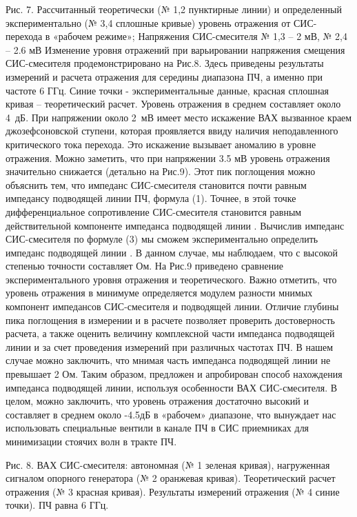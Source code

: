 \documentclass[a4paper]{article}
\begin{document}
Рис. 7. Рассчитанный теоретически (№ 1,2 пунктирные линии) и определенный экспериментально (№ 3,4 сплошные кривые) уровень отражения от СИС-перехода в «рабочем режиме»; Напряжения СИС-смесителя № 1,3 –  2 мВ, № 2,4 – 2.6 мВ
Изменение уровня отражений при варьировании напряжения смещения СИС-смесителя продемонстрировано на Рис.8. Здесь приведены результаты измерений и расчета отражения для середины диапазона ПЧ, а именно при частоте 6 ГГц. Синие точки - экспериментальные данные, красная сплошная кривая – теоретический расчет. Уровень отражения в среднем составляет около 4 дБ. При напряжении около 2 мВ имеет место искажение ВАХ вызванное краем джозефсоновской ступени, которая проявляется ввиду наличия неподавленного критического тока перехода. Это искажение вызывает аномалию в уровне отражения.  Можно заметить, что при напряжении 3.5 мВ уровень отражения значительно снижается (детально на Рис.9). Этот пик поглощения можно объяснить тем, что импеданс СИС-смесителя становится почти равным  импедансу подводящей линии ПЧ, формула (1). Точнее, в этой точке дифференциальное сопротивление СИС-смесителя становится равным действительной компоненте импеданса подводящей линии .  Вычислив импеданс СИС-смесителя по формуле (3) мы сможем экспериментально определить импеданс подводящей линии . В данном случае, мы наблюдаем, что  с высокой степенью точности составляет  Ом. На Рис.9 приведено сравнение экспериментального уровня отражения и теоретического. Важно отметить, что уровень отражения в минимуме определяется модулем разности мнимых компонент импедансов СИС-смесителя и подводящей линии. Отличие глубины пика поглощения в измерении и в расчете позволяет проверить достоверность расчета, а также оценить величину комплексной части импеданса подводящей линии и за счет проведения измерений при различных частотах ПЧ. В нашем случае можно заключить, что мнимая часть импеданса подводящей линии не превышает 2 Ом. Таким образом, предложен и апробирован способ нахождения импеданса подводящей линии, используя особенности ВАХ СИС-смесителя.
В целом, можно заключить, что уровень отражения достаточно высокий и составляет в среднем около -4.5дБ в «рабочем» диапазоне, что вынуждает нас использовать специальные вентили в канале ПЧ в СИС приемниках для минимизации стоячих волн в тракте ПЧ.

 
Рис. 8. ВАХ СИС-смесителя: автономная (№ 1 зеленая кривая), нагруженная сигналом опорного генератора (№ 2 оранжевая кривая). Теоретический расчет отражения (№ 3 красная кривая). Результаты измерений отражения (№ 4 синие точки). ПЧ равна 6 ГГц.
\end{document}
